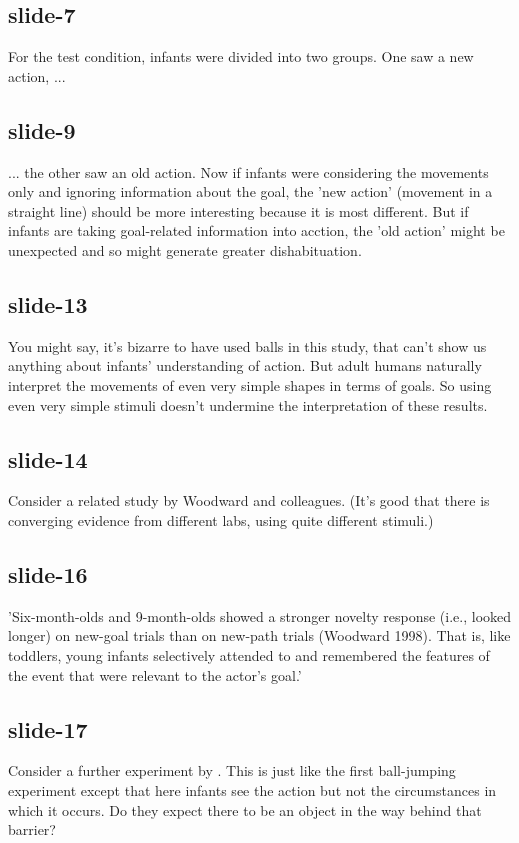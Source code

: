 \documentclass[12pt,\papersize]{extarticle}
\begin{document}
 
\subsection{slide-7}
For the test condition, infants were divided into two groups. One saw a new action, ...
 
 
\subsection{slide-9}
... the other saw an old action.
Now if infants were considering the movements only and ignoring information about the goal, the 'new action' (movement in a straight line) should be more interesting because it is most different.
But if infants are taking goal-related information into acction, the 'old action' might be unexpected and so might generate greater dishabituation.
 
 
\subsection{slide-13}
You might say, it's bizarre to have used balls in this study, that can't show us anything about infants' understanding of action.
But adult humans naturally interpret the movements of even very simple shapes in terms of goals.
So using even very simple stimuli doesn't undermine the interpretation of these results.
 
 
\subsection{slide-14}
Consider a related study by Woodward and colleagues.
(It's good that there is converging evidence from different labs, using quite different stimuli.)
 
 
\subsection{slide-16}
'Six-month-olds and 9-month-olds showed a stronger novelty response (i.e., looked longer) on new-goal trials than on new-path trials (Woodward 1998). That is, like toddlers, young infants selectively attended to and remembered the features of the event that were relevant to the actor’s goal.'
\citep[p.\ 153]{woodward:2001_making}
 
 
\subsection{slide-17}
Consider a further experiment by \citet{Csibra:2003jv}.
This is just like the first ball-jumping experiment except that here infants see the action but not the circumstances in which it occurs.
Do they expect there to be an object in the way behind that barrier?
 
\end{document}
